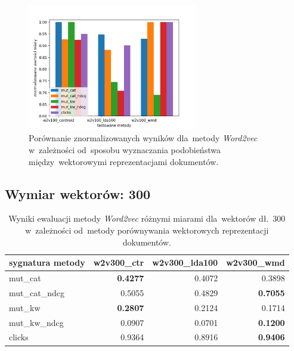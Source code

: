 \documentclass[pl]{minipw} %
\begin{document}
\begin{figure}[H]
	\centering
	\includegraphics[width=0.66\textwidth]{img/results/w2v100_centroid_w2v100_lda100_w2v100_wmd_.png}
	\caption{Porównanie znormalizowanych wyników dla~metody \textit{Word2vec} w~zależności od~sposobu wyznaczania podobieństwa między~wektorowymi reprezentacjami dokumentów.}
\end{figure}

\subsection{Wymiar wektorów: 300}


\begin{table}[H]
	\centering
	\begin{tabular}{lrrr}
		\hline
		sygnatura metody &   w2v300\_ctr &   w2v300\_lda100 &   w2v300\_wmd \\
	\hline
	mut\_cat      &            \textbf{0.4277} &          0.4072 &       0.3898 \\
	mut\_cat\_ndcg &            0.5055 &          0.4829 &       \textbf{0.7055} \\
	mut\_kw       &            \textbf{0.2807} &          0.2124 &       0.1714 \\
	mut\_kw\_ndcg  &            0.0907 &          0.0701 &       \textbf{0.1200}   \\
	clicks       &            0.9364 &          0.8916 &       \textbf{0.9406} \\
	\hline
	\end{tabular}
	\caption{Wyniki ewaluacji metody \textit{Word2vec} różnymi miarami dla~wektorów dł.~300 w~zależności od~metody porównywania wektorowych reprezentacji dokumentów.}
\end{table}
\end{document}
